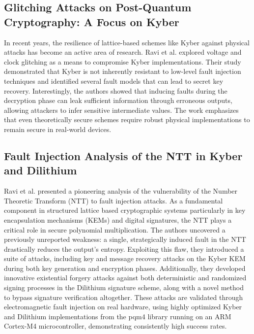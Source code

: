 \subsection*{Glitching Attacks on Post-Quantum Cryptography: A Focus on Kyber ~\cite{ravi2021fault}}

In recent years, the resilience of lattice-based schemes like Kyber against physical attacks has become an active area of research. Ravi et al. explored voltage and clock glitching as a means to compromise Kyber implementations. Their study demonstrated that Kyber is not inherently resistant to low-level fault injection techniques and identified several fault models that can lead to secret key recovery. Interestingly, the authors showed that inducing faults during the decryption phase can leak sufficient information through erroneous outputs, allowing attackers to infer sensitive intermediate values. The work emphasizes that even theoretically secure schemes require robust physical implementations to remain secure in real-world devices.

\subsection*{Fault Injection Analysis of the NTT in Kyber and Dilithium \cite{Ravi_Yang_Bhasin_Zhang_Chattopadhyay_2023} }
Ravi et al. presented a pioneering analysis of the vulnerability of the Number Theoretic Transform (NTT) to fault injection attacks. As a fundamental component in structured lattice based cryptographic systems particularly in key encapsulation mechanisms (KEMs) and digital signatures, the NTT plays a critical role in secure polynomial multiplication. The authors uncovered a previously unreported weakness: a single, strategically induced fault in the NTT drastically reduces the output’s entropy. Exploiting this flaw, they introduced a suite of attacks, including key and message recovery attacks on the Kyber KEM during both key generation and encryption phases. Additionally, they developed innovative existential forgery attacks against both deterministic and randomized signing processes in the Dilithium signature scheme, along with a novel method to bypass signature verification altogether. These attacks are validated through electromagnetic fault injection on real hardware, using highly optimized Kyber and Dilithium implementations from the pqm4 library running on an ARM Cortex-M4 microcontroller, demonstrating consistently high success rates.